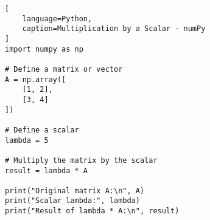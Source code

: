 \begin{lstlisting}[
    language=Python,
    caption=Multiplication by a Scalar - numPy
]
import numpy as np

# Define a matrix or vector
A = np.array([
    [1, 2],
    [3, 4]
])

# Define a scalar
lambda = 5

# Multiply the matrix by the scalar
result = lambda * A

print("Original matrix A:\n", A)
print("Scalar lambda:", lambda)
print("Result of lambda * A:\n", result)
\end{lstlisting}




